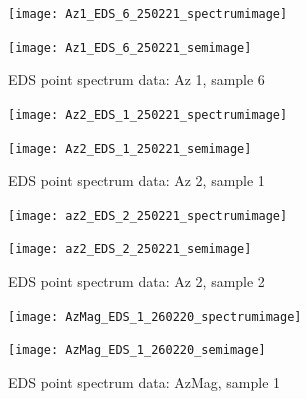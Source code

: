 \begin{figure}[H]
\centering
\begin{minipage}{.45\textwidth}
  \centering
  \texttt{[image: Az1\_EDS\_6\_250221\_spectrumimage]}
\end{minipage}
\begin{minipage}{.45\textwidth}
  \centering
  \texttt{[image: Az1\_EDS\_6\_250221\_semimage]}
\end{minipage}
\caption[EDS point spectrum data: Az 1, sample 6]{EDS point spectrum data: Az 1, sample 6}
\label{fig:az1_point_eds_6}
\end{figure}



\begin{figure}[H]
\centering
\begin{minipage}{.45\textwidth}
  \centering
  \texttt{[image: Az2\_EDS\_1\_250221\_spectrumimage]}
\end{minipage}
\begin{minipage}{.45\textwidth}
  \centering
  \texttt{[image: Az2\_EDS\_1\_250221\_semimage]}
\end{minipage}
\caption[EDS point spectrum data: Az 2, sample 1]{EDS point spectrum data: Az 2, sample 1}
\label{fig:az2_point_eds_1}
\end{figure}

\begin{figure}[H]
\centering
\begin{minipage}{.45\textwidth}
  \centering
  \texttt{[image: az2\_EDS\_2\_250221\_spectrumimage]}
\end{minipage}
\begin{minipage}{.45\textwidth}
  \centering
  \texttt{[image: az2\_EDS\_2\_250221\_semimage]}
\end{minipage}
\caption[EDS point spectrum data: Az 2, sample 2]{EDS point spectrum data: Az 2, sample 2}
\label{fig:az2_point_eds_2}
\end{figure}


\begin{figure}[H]
\centering
\begin{minipage}{.45\textwidth}
  \centering
  \texttt{[image: AzMag\_EDS\_1\_260220\_spectrumimage]}
\end{minipage}
\begin{minipage}{.45\textwidth}
  \centering
  \texttt{[image: AzMag\_EDS\_1\_260220\_semimage]}
\end{minipage}
\caption[EDS point spectrum data: AzMag, sample 1]{EDS point spectrum data: AzMag, sample 1}
\label{fig:azmag_point_eds_1}
\end{figure}

